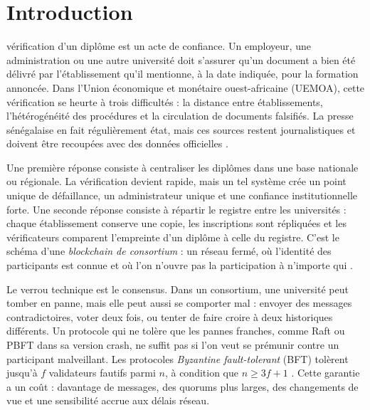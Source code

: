 \documentclass[conference]{IEEEtran}
\begin{document}
\section{Introduction}

 vérification d'un diplôme est un acte de confiance. Un employeur, une administration ou une autre université doit s'assurer qu'un document a bien été délivré par l'établissement qu'il mentionne, à la date indiquée, pour la formation annoncée. Dans l'Union économique et monétaire ouest-africaine (UEMOA), cette vérification se heurte à trois difficultés : la distance entre établissements, l'hétérogénéité des procédures et la circulation de documents falsifiés. La presse sénégalaise en fait régulièrement état, mais ces sources restent journalistiques et doivent être recoupées avec des données officielles \cite{dakaractu2025,ndarinfo2026}.

Une première réponse consiste à centraliser les diplômes dans une base nationale ou régionale. La vérification devient rapide, mais un tel système crée un point unique de défaillance, un administrateur unique et une confiance institutionnelle forte. Une seconde réponse consiste à répartir le registre entre les universités : chaque établissement conserve une copie, les inscriptions sont répliquées et les vérificateurs comparent l'empreinte d'un diplôme à celle du registre. C'est le schéma d'une \emph{blockchain de consortium} : un réseau fermé, où l'identité des participants est connue et où l'on n'ouvre pas la participation à n'importe qui \cite{androulaki2018fabric,wust2018blockchain}.

Le verrou technique est le consensus. Dans un consortium, une université peut tomber en panne, mais elle peut aussi se comporter mal : envoyer des messages contradictoires, voter deux fois, ou tenter de faire croire à deux historiques différents. Un protocole qui ne tolère que les pannes franches, comme Raft ou PBFT dans sa version crash, ne suffit pas si l'on veut se prémunir contre un participant malveillant. Les protocoles \emph{Byzantine fault-tolerant} (BFT) tolèrent jusqu'à $f$ validateurs fautifs parmi $n$, à condition que $n \geq 3f+1$ \cite{lamport1982byzantine,castro1999pbft}. Cette garantie a un coût : davantage de messages, des quorums plus larges, des changements de vue et une sensibilité accrue aux délais réseau.
\end{document}

